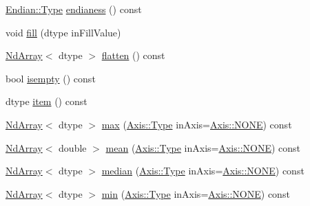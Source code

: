 \begin{DoxyCompactItemize}
\item 
\mbox{\hyperlink{struct_num_c_1_1_endian_ab667001489f67f8a96f328f0a9c351fa}{Endian\+::\+Type}} \mbox{\hyperlink{class_num_c_1_1_nd_array_acb277ffe6553d9c77f2c86e62fe96945}{endianess}} () const
\item 
void \mbox{\hyperlink{class_num_c_1_1_nd_array_aa2fe95342a32bcf98b7961499b2e4378}{fill}} (dtype in\+Fill\+Value)
\item 
\mbox{\hyperlink{class_num_c_1_1_nd_array}{Nd\+Array}}$<$ dtype $>$ \mbox{\hyperlink{class_num_c_1_1_nd_array_a37128bae07c734f4f9edce7265f67ff0}{flatten}} () const
\item 
bool \mbox{\hyperlink{class_num_c_1_1_nd_array_af21818e8cf4a9c0938a3f444894d0fea}{isempty}} () const
\item 
dtype \mbox{\hyperlink{class_num_c_1_1_nd_array_a3be50d8f34980d81b51bdf25d09ffdfb}{item}} () const
\item 
\mbox{\hyperlink{class_num_c_1_1_nd_array}{Nd\+Array}}$<$ dtype $>$ \mbox{\hyperlink{class_num_c_1_1_nd_array_ae080f0343d72279ca5f5e51722bf2f4b}{max}} (\mbox{\hyperlink{struct_num_c_1_1_axis_a8e689044ef1941a03482e730c5e7ebb3}{Axis\+::\+Type}} in\+Axis=\mbox{\hyperlink{struct_num_c_1_1_axis_a8e689044ef1941a03482e730c5e7ebb3a0ae033c4226f7184bf0050b101e7ed94}{Axis\+::\+N\+O\+NE}}) const
\item 
\mbox{\hyperlink{class_num_c_1_1_nd_array}{Nd\+Array}}$<$ double $>$ \mbox{\hyperlink{class_num_c_1_1_nd_array_af4176e740965e272fa24fda54dd2e875}{mean}} (\mbox{\hyperlink{struct_num_c_1_1_axis_a8e689044ef1941a03482e730c5e7ebb3}{Axis\+::\+Type}} in\+Axis=\mbox{\hyperlink{struct_num_c_1_1_axis_a8e689044ef1941a03482e730c5e7ebb3a0ae033c4226f7184bf0050b101e7ed94}{Axis\+::\+N\+O\+NE}}) const
\item 
\mbox{\hyperlink{class_num_c_1_1_nd_array}{Nd\+Array}}$<$ dtype $>$ \mbox{\hyperlink{class_num_c_1_1_nd_array_a8ac6430930f379b06f650db8ca7aa62b}{median}} (\mbox{\hyperlink{struct_num_c_1_1_axis_a8e689044ef1941a03482e730c5e7ebb3}{Axis\+::\+Type}} in\+Axis=\mbox{\hyperlink{struct_num_c_1_1_axis_a8e689044ef1941a03482e730c5e7ebb3a0ae033c4226f7184bf0050b101e7ed94}{Axis\+::\+N\+O\+NE}}) const
\item 
\mbox{\hyperlink{class_num_c_1_1_nd_array}{Nd\+Array}}$<$ dtype $>$ \mbox{\hyperlink{class_num_c_1_1_nd_array_a1f4c77688334d3760f4df54137ce9c32}{min}} (\mbox{\hyperlink{struct_num_c_1_1_axis_a8e689044ef1941a03482e730c5e7ebb3}{Axis\+::\+Type}} in\+Axis=\mbox{\hyperlink{struct_num_c_1_1_axis_a8e689044ef1941a03482e730c5e7ebb3a0ae033c4226f7184bf0050b101e7ed94}{Axis\+::\+N\+O\+NE}}) const

\end{DoxyCompactItemize}
